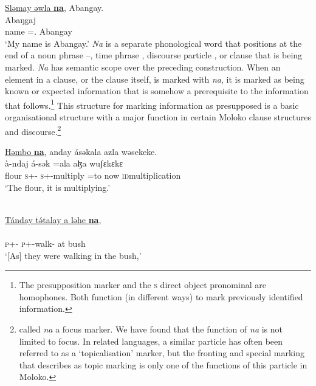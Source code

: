 \ea \label{ex:11:2}
\underline{Sləmay  əwla  \textbf{na}},  Abangay.\\
\gll {}        Abaŋgaj\\
      name  ={\oneS}.{\POSS} {\PSP}  Abangay\\
\glt  ‘My name is Abangay.’
\z
\largerpage
\textit{Na} is a separate phonological word that positions at the end of a noun phrase --, time phrase , discourse particle , or clause  that is being marked. \textit{Na} has semantic scope over the preceding construction. When an element in a clause, or the clause itself, is marked with \textit{na}, it is marked as being known or expected information that is somehow a prerequisite to the information that follows.\footnote{The presupposition marker and the \textsc{s} direct object pronominal  are homophones. Both function (in different ways) to mark previously identified information.} This structure for marking information as presupposed is a basic organisational structure with  a major function in certain Moloko clause structures and discourse.\footnote{\citet{Bow1997c} called \textit{na} a focus marker. We have found that the function of \textit{na} is not limited to focus. In related languages, a similar particle has often been referred to as a ‘topicalisation’ marker, but the fronting and special marking that \citet{Levinsohn1994} describes as topic marking is only one of the functions of this particle in Moloko.}

\ea \label{ex:11:3}
\underline{Həmbo  \textbf{na}},  anday  ásəkala  azla  wəsekeke.\\
\gll  {}   à-ndaj      á-sək    =ala     aɮa   wuʃɛkɛkɛ\\
      flour  {\PSP}  \textsc{s}+{\PFV}-{\PRG}   \textsc{s}+{\IFV}-multiply  =to  now    \textsc{id}multiplication\\
\glt  ‘The flour, it is multiplying.’
\z

\ea \label{ex:11:4}
\\
\underline{Tánday  t\'ətalay  a  ləhe  \textbf{na}},\\  
\gll  {}    \\ 
      \textsc{p}+{\IFV}-{\PRG}  \textsc{p}+{\IFV}-walk{}-{\CL}  at  bush  {\PSP}\\
\glt ‘[As] they were walking in the bush,’\\
      
